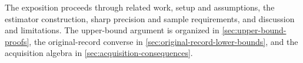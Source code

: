 The exposition proceeds through related work, setup and assumptions, the estimator construction, sharp precision and sample requirements, and discussion and limitations. The upper-bound argument is organized in \cref{sec:upper-bound-proofs}, the original-record converse in \cref{sec:original-record-lower-bounds}, and the acquisition algebra in \cref{sec:acquisition-consequences}.
